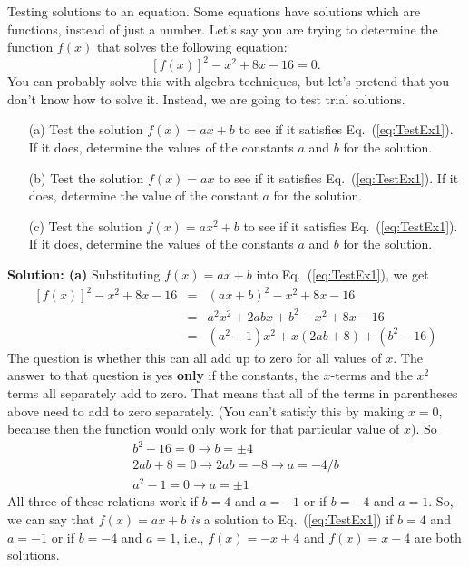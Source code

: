 
\begin{example}{Testing solutions to an equation.}
Some equations have solutions which are functions, instead of just a number.
Let's say you are trying to determine the function $f(x)$ that solves
the following equation:
\begin{equation}
\left[f(x)\right]^2 - x^2 + 8x - 16 = 0.
\label{eq:TestEx1}
\end{equation}
You can probably solve this with algebra techniques, but let's pretend
that you don't know how to solve it. Instead, we are going to test trial
solutions.
\begin{enumerate}
\item[(a)]
Test the solution $f(x) = ax+b$ to see if it satisfies Eq.~(\ref{eq:TestEx1}).
If it does, determine the values of the constants $a$ and $b$ for the solution.
\item[(b)]
Test the solution $f(x) = ax$ to see if it satisfies Eq.~(\ref{eq:TestEx1}).
If it does, determine the value of the constant $a$ for the solution.
\item[(c)]
Test the solution $f(x) = ax^2+b$ to see if it satisfies Eq.~(\ref{eq:TestEx1}).
If it does, determine the values of the constants $a$ and $b$ for the solution.
\end{enumerate}
{\bf Solution: (a)} Substituting $f(x) = ax+b$ into Eq.~(\ref{eq:TestEx1}), 
we get
\begin{eqnarray}
\left[f(x)\right]^2-x^2+8x-16 & = & (ax+b)^2-x^2+8x-16 \nonumber \\
& = & a^2x^2+2abx+b^2-x^2+8x-16 \nonumber \\
& = & (a^2-1)x^2+x(2ab+8)+(b^2-16) \nonumber
\end{eqnarray}
The question is whether this can all add up to zero for all values of $x$.
The answer to that question is yes {\bf only} if the constants, the $x$-terms 
and the $x^2$ terms all separately add to zero.  That means that all of 
the terms in parentheses above need to add to zero separately.  (You can't
satisfy this by making $x=0$, because then the function would only work for
that particular value of $x$). So
\begin{eqnarray}
b^2-16 = 0 \rightarrow b = \pm 4 \nonumber \\
2ab+8 = 0 \rightarrow 2ab=-8 \rightarrow a=-4/b \nonumber \\
a^2-1=0 \rightarrow a= \pm1 \nonumber
\end{eqnarray}
All three of these relations work if $b=4$ and $a=-1$ or if $b=-4$ and
$a=1$. So, we can say that $f(x)=ax+b$ {\it is} a solution to 
Eq.~(\ref{eq:TestEx1}) if $b=4$ and $a=-1$ or if $b=-4$ and $a=1$, i.e.,
$f(x) = -x+4$ and $f(x)=x-4$ are both solutions.


\end{example}
